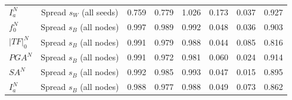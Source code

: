 \begin{table}[!ht]
\begin{tabular*}{\textwidth}{@{\extracolsep{\fill}}lccccccc@{}}
$I_a^N$ & Spread $s_W$ (all seeds) & 0.759 & 0.779 & 1.026 & 0.173 & 0.037 & 0.927 \\
$f_0^N$ & Spread $s_B$ (all nodes) & 0.997 & 0.989 & 0.992 & 0.048 & 0.036 & 0.903 \\
$\lvert TF\rvert_0^N$ & Spread $s_B$ (all nodes) & 0.991 & 0.979 & 0.988 & 0.044 & 0.085 & 0.816 \\
$PGA^N$ & Spread $s_B$ (all nodes) & 0.991 & 0.972 & 0.981 & 0.060 & 0.024 & 0.914 \\
$SA^N$ & Spread $s_B$ (all nodes) & 0.992 & 0.985 & 0.993 & 0.047 & 0.015 & 0.895 \\
$I_a^N$ & Spread $s_B$ (all nodes) & 0.988 & 0.977 & 0.988 & 0.049 & 0.073 & 0.862 \\
\bottomrule
\end{tabular*}
\end{table}
